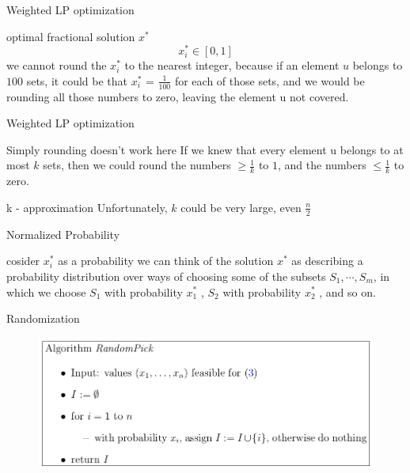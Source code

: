 \documentclass[24pt,pdf,xcolor=table]{beamer}
\begin{document}
\begin{frame}{Weighted LP optimization}
	\begin{block}{optimal fractional solution $x^*$}
	  $$x^*_i \in [0, 1]$$
	  we cannot round the $x^*_i$ to the nearest integer, because if an element $u$ belongs to $100$ sets, it could be
that $x^*_i$ = $\frac{1}{100}$ for each of those sets, and we would be rounding all those numbers to zero, leaving the element u not covered.
	\end{block}
\end{frame}	

\begin{frame}{Weighted LP optimization}
	\begin{block}{Simply rounding doesn't work here}
	  If we knew that every element u belongs to at most $k$ sets, then we could round the numbers $\ge \frac{1}{k}$ to $1$, and the numbers $\le \frac{1}{k}$ to zero.
	\end{block}
	\begin{block}{k - approximation}
	  Unfortunately, $k$ could be very large, even $\frac{n}{2}$
	\end{block}
\end{frame}	

\begin{frame}{Normalized Probability}
	\begin{block}{cosider $x^*_i$ as a probability}
	  we can think of the solution $x^*$ as describing a probability distribution over ways of choosing some of the subsets $S_1 , \cdots , S_m$, in which we choose $S_1$ with probability $x^*_1$ , $S_2$ with probability $x^*_2$ , and so on.
	\end{block}
\end{frame}	

\begin{frame}{Randomization}
	\begin{figure}[h]
		\centering
		\includegraphics[width=1.0\textwidth]{./images/rp.png}
	\end{figure}
\end{frame}	
\end{document}
